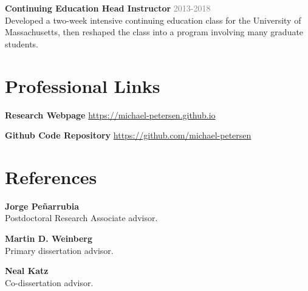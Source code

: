 \documentclass[margin, 11pt]{res} %
\begin{document}
\begin{resume}
{\bf Continuing Education Head Instructor} \hfill \textcolor{grey}{2013-2018}\\
Developed a two-week intensive continuing education class for the University of Massachusetts, then reshaped the class into a program involving many graduate students.

%


\section{\sc \textcolor{redshade}{Professional Links}}
{\bf Research Webpage} \url{https://michael-petersen.github.io}

{\bf Github Code Repository} \url{https://github.com/michael-petersen}


\section{\sc \textcolor{redshade}{References}}

{\bf Jorge Pe{\~n}arrubia}\\
Postdoctoral Research Associate advisor.

{\bf Martin D. Weinberg}\\
Primary dissertation advisor.

{\bf Neal Katz}\\
Co-dissertation advisor.


\end{resume}
\end{document}
